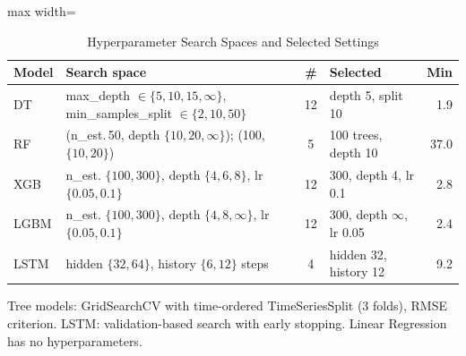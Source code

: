 \begin{table}[!htb]
\centering
\caption{Hyperparameter Search Spaces and Selected Settings}
\label{tab:grids}
\footnotesize
\setlength{\tabcolsep}{4pt}
\begin{adjustbox}{max width=\columnwidth}
\begin{tabular}{lp{3.6cm}cp{2.3cm}r}
\toprule
Model & Search space & \# & Selected & Min \\
\midrule
DT & max\_depth $\in\{5,10,15,\infty\}$, min\_samples\_split $\in\{2,10,50\}$ & 12 & depth 5, split 10 & 1.9 \\
RF & (n\_est.\,50, depth $\{10,20,\infty\}$); (100, $\{10,20\}$) & 5 & 100 trees, depth 10 & 37.0 \\
XGB & n\_est. $\{100,300\}$, depth $\{4,6,8\}$, lr $\{0.05,0.1\}$ & 12 & 300, depth 4, lr 0.1 & 2.8 \\
LGBM & n\_est. $\{100,300\}$, depth $\{4,8,\infty\}$, lr $\{0.05,0.1\}$ & 12 & 300, depth $\infty$, lr 0.05 & 2.4 \\
LSTM & hidden $\{32,64\}$, history $\{6,12\}$ steps & 4 & hidden 32, history 12 & 9.2 \\
\bottomrule
\end{tabular}
\end{adjustbox}
\par\vspace{3pt}
{\scriptsize Tree models: GridSearchCV with time-ordered TimeSeriesSplit (3 folds), RMSE criterion. LSTM: validation-based search with early stopping. Linear Regression has no hyperparameters.\par}
\end{table}
